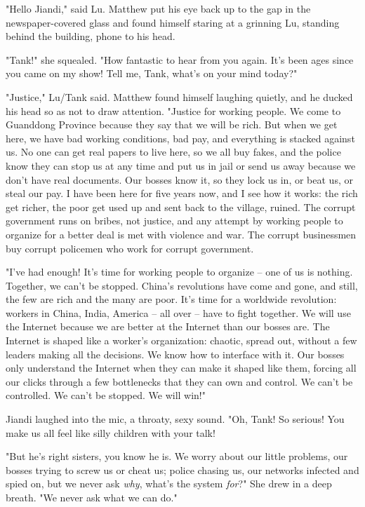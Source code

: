 "Hello Jiandi," said Lu. Matthew put his eye back up to the gap in
the newspaper-covered glass and found himself staring at a grinning
Lu, standing behind the building, phone to his head.

"Tank!" she squealed. "How fantastic to hear from you again. It's
been ages since you came on my show! Tell me, Tank, what's on your
mind today?"

"Justice," Lu/Tank said. Matthew found himself laughing quietly,
and he ducked his head so as not to draw attention. "Justice for
working people. We come to Guanddong Province because they say that
we will be rich. But when we get here, we have bad working
conditions, bad pay, and everything is stacked against us. No one
can get real papers to live here, so we all buy fakes, and the
police know they can stop us at any time and put us in jail or send
us away because we don't have real documents. Our bosses know it,
so they lock us in, or beat us, or steal our pay. I have been here
for five years now, and I see how it works: the rich get richer,
the poor get used up and sent back to the village, ruined. The
corrupt government runs on bribes, not justice, and any attempt by
working people to organize for a better deal is met with violence
and war. The corrupt businessmen buy corrupt policemen who work for
corrupt government.

"I've had enough! It's time for working people to organize -- one
of us is nothing. Together, we can't be stopped. China's
revolutions have come and gone, and still, the few are rich and the
many are poor. It's time for a worldwide revolution: workers in
China, India, America -- all over -- have to fight together. We
will use the Internet because we are better at the Internet than
our bosses are. The Internet is shaped like a worker's
organization: chaotic, spread out, without a few leaders making all
the decisions. We know how to interface with it. Our bosses only
understand the Internet when they can make it shaped like them,
forcing all our clicks through a few bottlenecks that they can own
and control. We can't be controlled. We can't be stopped. We will
win!"

Jiandi laughed into the mic, a throaty, sexy sound. "Oh, Tank! So
serious! You make us all feel like silly children with your talk!

"But he's right sisters, you know he is. We worry about our little
problems, our bosses trying to screw us or cheat us; police chasing
us, our networks infected and spied on, but we never ask
\emph{why}, what's the system \emph{for}?" She drew in a deep
breath. "We never ask what we can do."

